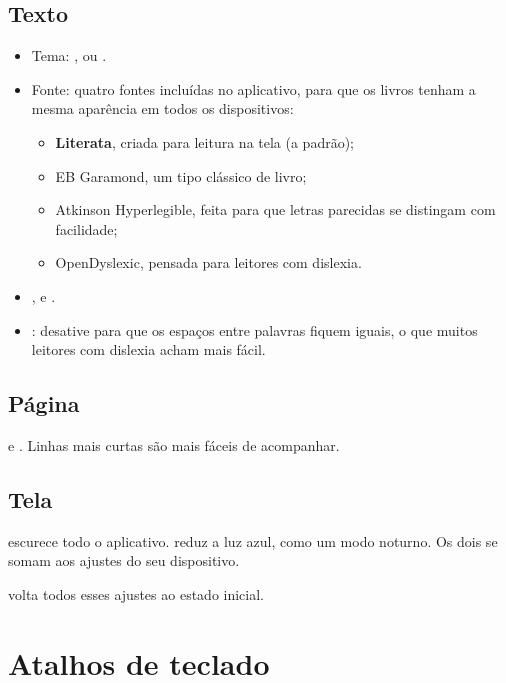 \documentclass[11pt]{article}
\begin{document}
\subsection{Texto}
\begin{itemize}
  \item Tema: ,  ou .
  \item Fonte: quatro fontes incluídas no aplicativo, para que os livros tenham a mesma aparência
        em todos os dispositivos:
  \begin{itemize}
    \item \textbf{Literata}, criada para leitura na tela (a padrão);
    \item {\garamondfont EB Garamond}, um tipo clássico de livro;
    \item {\sffamily Atkinson Hyperlegible}, feita para que letras parecidas se distingam com
          facilidade;
    \item {\dyslexicfont OpenDyslexic}, pensada para leitores com dislexia.
  \end{itemize}
  \item {},  e .
  \item {}: desative para que os espaços entre palavras fiquem iguais, o que
        muitos leitores com dislexia acham mais fácil.
\end{itemize}

\subsection{Página}
 e . Linhas mais curtas são mais fáceis de acompanhar.

\subsection{Tela}
 escurece todo o aplicativo.  reduz a luz azul, como um modo noturno.
Os dois se somam aos ajustes do seu dispositivo.

 volta todos esses ajustes ao estado inicial.

\section{Atalhos de teclado}
\end{document}
